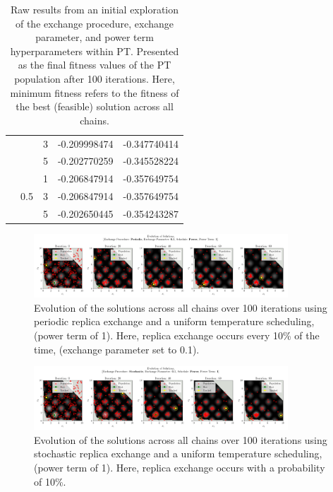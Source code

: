 \documentclass[10pt]{article}
\begin{document}
\begin{table}[H]
\begin{tabular}{|*{5}{c|}}
        & & 3\cellcolor{lightgray} & -0.209998474 \cellcolor{lightgray}& -0.347740414\cellcolor{lightgray} \\
        & & 5\cellcolor{gray} & -0.202770259\cellcolor{gray} & -0.345528224\cellcolor{gray} \\
        \cline{2-5}
        & \multirow{3}{*}{0.5} & 1 & -0.206847914 & -0.357649754 \\
        & & 3\cellcolor{lightgray} & -0.206847914\cellcolor{lightgray} & -0.357649754\cellcolor{lightgray} \\
        & & 5\cellcolor{gray} & -0.202650445\cellcolor{gray} & -0.354243287\cellcolor{gray} \\
        \hline
    \end{tabular}
    \caption{Raw results from an initial exploration of the exchange procedure, exchange parameter, and power term hyperparameters within PT. Presented as the final fitness values of the PT population after 100 iterations. Here, minimum fitness refers to the fitness of the best (feasible) solution across all chains.}
    \label{tab:exchange_results}
\end{table}

\begin{figure}[H]
    \centering
    \includegraphics[width=0.85\textwidth]{../figures/KBF/100_iters/Periodic/Power/0.1_1_Solutions.png}
    \captionsetup{justification=centering}
    \caption{Evolution of the solutions across all chains over 100 iterations using periodic replica exchange and a uniform temperature scheduling, (power term of 1). Here, replica exchange occurs every 10\% of the time, (exchange parameter set to 0.1).}
    \label{fig:PeriodicApp}
\end{figure}

\begin{figure}[H]
    \centering
    \includegraphics[width=0.85\textwidth]{../figures/KBF/100_iters/Stochastic/Power/0.1_1_Solutions.png}
    \captionsetup{justification=centering}
    \caption{Evolution of the solutions across all chains over 100 iterations using stochastic replica exchange and a uniform temperature scheduling, (power term of 1). Here, replica exchange occurs with a probability of 10\%.}
    \label{fig:StochasticApp}
\end{figure}
\end{document}
